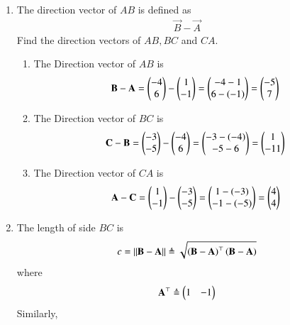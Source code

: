 \begin{enumerate}[label=\thesubsection.\arabic*.,ref=\thesubsection.\theenumi]
\item The direction vector of $AB$ is defined as
		\begin{align}
			\vec{B}-
			\vec{A}
		\end{align}
Find the direction vectors of $AB, BC$ and $CA$.
\\
\solution 
\begin{enumerate} 
\item  The Direction vector of $AB$ is 
	\begin{align}  \mathbf{B} - \mathbf{A} 
		=\begin{pmatrix} -4\\ 6 \end{pmatrix} - \begin{pmatrix} 1\\ -1 \end{pmatrix}
 = \begin{pmatrix} -4 - 1\\ 6 - (-1) \end{pmatrix} = \begin{pmatrix} -5\\ 7 \end{pmatrix}
		\label{eq:geo-dir-vec-ab}
 \end{align}
\item The Direction vector of $BC$ is
	\begin{align} \mathbf{C} - \mathbf{B}=\begin{pmatrix} -3\\ -5\end{pmatrix} - \begin{pmatrix} -4\\ 6 \end{pmatrix}
 = \begin{pmatrix} -3 - (-4)\\ -5 - 6 \end{pmatrix} = \begin{pmatrix}1\\ -11 \end{pmatrix}
		\label{eq:geo-dir-vec-bc}
  \end{align}
  \item  The Direction vector of $CA$  is
	  \begin{align}  \mathbf{A} - \mathbf{C} =\begin{pmatrix} 1\\ -1 \end{pmatrix}-\begin{pmatrix} -3\\ -5\end{pmatrix}
 = \begin{pmatrix} 1 - (-3)\\ -1 - (-5) \end{pmatrix} = \begin{pmatrix} 4\\ 4 \end{pmatrix}
		\label{eq:geo-dir-vec-ca}
  \end{align}
 \end{enumerate}
%	
	\item The length of side $BC$ is 
		\label{prob:side-length}
		\begin{align}
			c = \left\lVert\mathbf{B}-\mathbf{A}\right\rVert \triangleq \sqrt{\left(\mathbf{B}-\mathbf{A}\right)^{\top}\left(\mathbf{B}-\mathbf{A}\right)}
		\end{align}
		where
		\begin{align}
			\mathbf{A}^{\top}\triangleq\begin{pmatrix}1 & -1\end{pmatrix}
		\end{align}
		Similarly, 

\end{enumerate}
